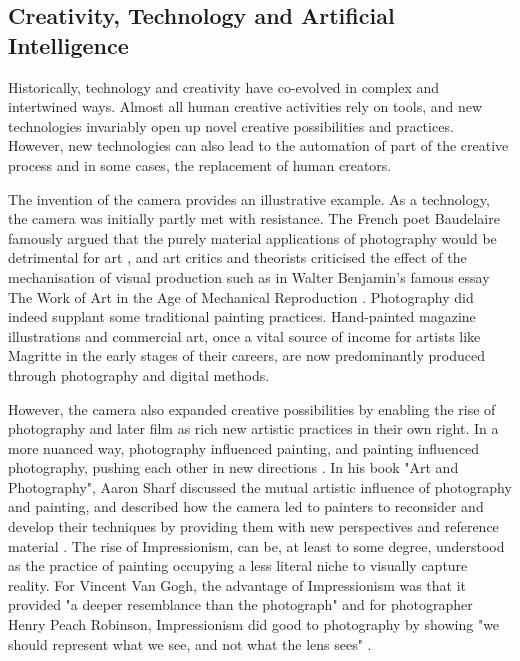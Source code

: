 \subsection{Creativity, Technology and Artificial Intelligence}

Historically, technology and creativity have co-evolved in complex and intertwined ways. Almost all human creative activities rely on tools, and new technologies invariably open up novel creative possibilities and practices. However, new technologies can also lead to the automation of part of the creative process and in some cases, the replacement of human creators.

The invention of the camera provides an illustrative example. As a technology, the camera was initially partly met with resistance. The French poet Baudelaire famously argued that the purely material applications of photography would be detrimental for art \cite{Baudelaire1955-ae}, and art critics and theorists criticised the effect of the mechanisation of visual production such as in Walter Benjamin's famous essay The Work of Art in the Age of Mechanical Reproduction \cite{Benjamin1935-wd} . Photography did indeed supplant some traditional painting practices. Hand-painted magazine illustrations and commercial art, once a vital source of income for artists like Magritte in the early stages of their careers, are now predominantly produced through photography and digital methods. 

However, the camera also expanded creative possibilities by enabling the rise of photography and later film as rich new artistic practices in their own right. In a more nuanced way, photography influenced painting, and painting influenced photography, pushing each other in new directions . In his book "Art and Photography", Aaron Sharf discussed the mutual artistic influence of photography and painting, and described how the camera led to painters to reconsider and develop their techniques by providing them with new perspectives and reference material \cite{Scharf1968-na}. The rise of Impressionism, can be, at least to some degree, understood as the practice of painting occupying a less literal niche to visually capture reality. For Vincent Van Gogh, the advantage of Impressionism was that it provided "a deeper resemblance than the photograph" \cite[p. 116]{Marmor1997-ka} and for photographer Henry Peach Robinson, Impressionism did good to photography by showing "we should represent what we see, and not what the lens sees" \cite[p. 87]{Robinson1896-mo}. 

